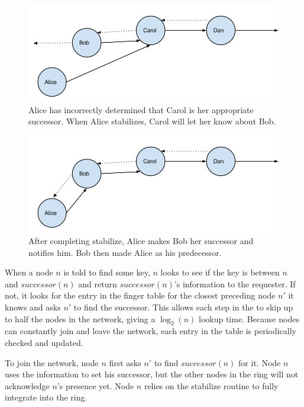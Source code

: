 \documentclass[conference, compsocconf, letterpaper]{IEEEtran}
\begin{document}
\begin{figure}
    \includegraphics[width=\linewidth]{abcd1}
    \caption{Alice has incorrectly determined that Carol is her appropriate successor.  When Alice stabilizes, Carol will let her know about Bob.}
    \label{abcd1}
\end{figure}


\begin{figure}
    \includegraphics[width=\linewidth]{abcd2}
    \caption{After completing stabilize, Alice makes Bob her successor and notifies him. Bob then made Alice as his predecessor.}
    \label{abcd2}
\end{figure}



When a node $n$ is told to find some key, $n$ looks to see if the key is between $n$ and $successor(n)$ and return $successor(n)$'s information to the requester. If not, it looks for the entry in the finger table for the closest preceding node $n'$ it knows and asks $n'$ to find the successor.  This allows each step in the to skip up to half the nodes in the network, giving a $\log_2(n)$ lookup time.  Because nodes can constantly join and leave the network, each entry in the table is periodically checked and updated. 

To join the network, node $n$ first asks $n'$ to find $successor(n)$ for it.  Node $n$ uses the information to set his successor, but the other nodes in the ring will not acknowledge $n$'s presence yet.  Node $n$ relies on the stabilize routine to fully integrate into the ring.
\end{document}
